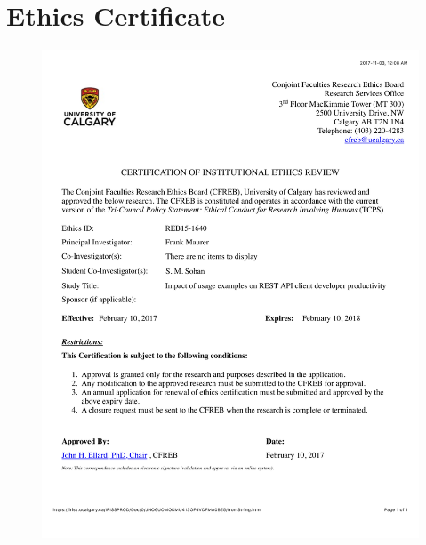 \chapter{Ethics Certificate}
\label{ethics}
\begin{figure}
 \centering
 \includegraphics[width=\textwidth]{ethics.pdf}
\end{figure}
